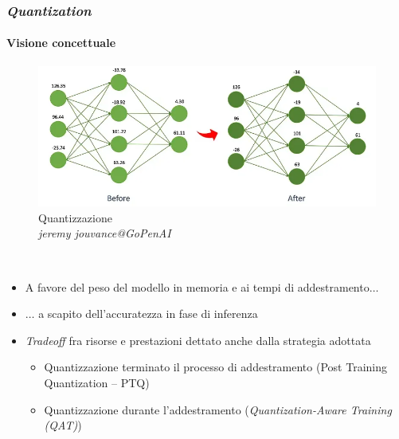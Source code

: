 %
\begin{frame}[t] \frametitle{\emph{Quantization}}
\framesubtitle{Visione concettuale}
{\scriptsize
{}
    \begin{minipage}[t]{\textwidth}
        \vspace*{-.3cm}
        \begin{figure}
            \centering
            \includegraphics[width=.8\textwidth]{img/quantization_concept_no_bg.png}
            {\tiny\\Quantizzazione\\\vspace*{-1pt}\textit{\textcopyright jeremy jouvance@GoPenAI}}
        \end{figure}
    \end{minipage}
    \\\vspace*{.3cm}
    \begin{minipage}[t]{\textwidth}
        \begin{itemize}[leftmargin=10pt,align=right]
            \item[\alert{\faArrowCircleRight}] A favore del peso del modello in memoria e ai tempi di addestramento$\ldots$
            \item[\alert{\faArrowCircleRight}] $\ldots$ a scapito dell'accuratezza in fase di inferenza
            \item[\alert{\faArrowCircleRight}]\emph{Tradeoff} fra risorse e prestazioni dettato anche dalla strategia adottata
            \begin{itemize}[leftmargin=10pt,align=right]
                \item[\alert{\faArrowCircleRight}] Quantizzazione terminato il processo di addestramento (\alert{P}ost \alert{T}raining \alert{Q}uantization -- PTQ)
                \item[\alert{\faArrowCircleRight}] Quantizzazione durante l'addestramento (\emph{\alert{Q}uantization-\alert{A}ware \alert{T}raining (QAT)})
            \end{itemize}
        \end{itemize}
    \end{minipage}
}
\end{frame}
